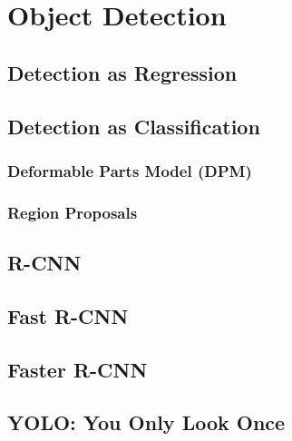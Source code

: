 	\section{Object Detection} %

		\subsection{Detection as Regression} %

		\subsection{Detection as Classification} %

			\subsubsection{Deformable Parts Model (DPM)} %

			\subsubsection{Region Proposals} %

		\subsection{R-CNN} %

		\subsection{Fast R-CNN} %

		\subsection{Faster R-CNN} %

		\subsection{YOLO: You Only Look Once} %

